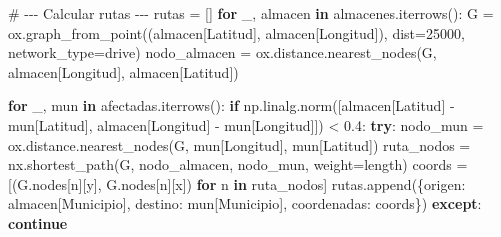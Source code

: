 \documentclass[
  spanish,
  us-letterpaper,
]{scrreprt}
\newenvironment{Shaded}{\begin{snugshade}}{\end{snugshade}}
\newcommand{\CommentTok}[1]{\textcolor[rgb]{0.37,0.37,0.37}{#1}}
\newcommand{\ControlFlowTok}[1]{\textcolor[rgb]{0.00,0.23,0.31}{\textbf{#1}}}
\newcommand{\DecValTok}[1]{\textcolor[rgb]{0.68,0.00,0.00}{#1}}
\newcommand{\FloatTok}[1]{\textcolor[rgb]{0.68,0.00,0.00}{#1}}
\newcommand{\KeywordTok}[1]{\textcolor[rgb]{0.00,0.23,0.31}{\textbf{#1}}}
\newcommand{\NormalTok}[1]{\textcolor[rgb]{0.00,0.23,0.31}{#1}}
\newcommand{\OperatorTok}[1]{\textcolor[rgb]{0.37,0.37,0.37}{#1}}
\newcommand{\StringTok}[1]{\textcolor[rgb]{0.13,0.47,0.30}{#1}}
\numberwithin{equation}{section}
\begin{document}
\begin{Shaded}
\begin{Highlighting}[]
\CommentTok{\# {-}{-}{-} Calcular rutas {-}{-}{-}}
\NormalTok{rutas }\OperatorTok{=}\NormalTok{ []}
\ControlFlowTok{for}\NormalTok{ \_, almacen }\KeywordTok{in}\NormalTok{ almacenes.iterrows():}
\NormalTok{    G }\OperatorTok{=}\NormalTok{ ox.graph\_from\_point((almacen[}\StringTok{\textquotesingle{}Latitud\textquotesingle{}}\NormalTok{], almacen[}\StringTok{\textquotesingle{}Longitud\textquotesingle{}}\NormalTok{]),}
\NormalTok{     dist}\OperatorTok{=}\DecValTok{25000}\NormalTok{, network\_type}\OperatorTok{=}\StringTok{\textquotesingle{}drive\textquotesingle{}}\NormalTok{)}
\NormalTok{    nodo\_almacen }\OperatorTok{=}\NormalTok{ ox.distance.nearest\_nodes(G, almacen[}\StringTok{\textquotesingle{}Longitud\textquotesingle{}}\NormalTok{],}
\NormalTok{     almacen[}\StringTok{\textquotesingle{}Latitud\textquotesingle{}}\NormalTok{])}

    \ControlFlowTok{for}\NormalTok{ \_, mun }\KeywordTok{in}\NormalTok{ afectadas.iterrows():}
        \ControlFlowTok{if}\NormalTok{ np.linalg.norm([almacen[}\StringTok{\textquotesingle{}Latitud\textquotesingle{}}\NormalTok{] }\OperatorTok{{-}}\NormalTok{ mun[}\StringTok{\textquotesingle{}Latitud\textquotesingle{}}\NormalTok{],}
\NormalTok{         almacen[}\StringTok{\textquotesingle{}Longitud\textquotesingle{}}\NormalTok{] }\OperatorTok{{-}}\NormalTok{ mun[}\StringTok{\textquotesingle{}Longitud\textquotesingle{}}\NormalTok{]]) }\OperatorTok{\textless{}} \FloatTok{0.4}\NormalTok{:}
            \ControlFlowTok{try}\NormalTok{:}
\NormalTok{                nodo\_mun }\OperatorTok{=}\NormalTok{ ox.distance.nearest\_nodes(G,}
\NormalTok{                 mun[}\StringTok{\textquotesingle{}Longitud\textquotesingle{}}\NormalTok{], mun[}\StringTok{\textquotesingle{}Latitud\textquotesingle{}}\NormalTok{])}
\NormalTok{                ruta\_nodos }\OperatorTok{=}\NormalTok{ nx.shortest\_path(G,}
\NormalTok{                 nodo\_almacen, nodo\_mun, weight}\OperatorTok{=}\StringTok{\textquotesingle{}length\textquotesingle{}}\NormalTok{)}
\NormalTok{                coords }\OperatorTok{=}\NormalTok{ [(G.nodes[n][}\StringTok{\textquotesingle{}y\textquotesingle{}}\NormalTok{],}
\NormalTok{                 G.nodes[n][}\StringTok{\textquotesingle{}x\textquotesingle{}}\NormalTok{]) }\ControlFlowTok{for}\NormalTok{ n }\KeywordTok{in}\NormalTok{ ruta\_nodos]}
\NormalTok{                rutas.append(\{}\StringTok{\textquotesingle{}origen\textquotesingle{}}\NormalTok{: almacen[}\StringTok{\textquotesingle{}Municipio\textquotesingle{}}\NormalTok{],}
                 \StringTok{\textquotesingle{}destino\textquotesingle{}}\NormalTok{: mun[}\StringTok{\textquotesingle{}Municipio\textquotesingle{}}\NormalTok{], }\StringTok{\textquotesingle{}coordenadas\textquotesingle{}}\NormalTok{: coords\})}
            \ControlFlowTok{except}\NormalTok{:}
                \ControlFlowTok{continue}


\end{Highlighting}
\end{Shaded}
\end{document}
